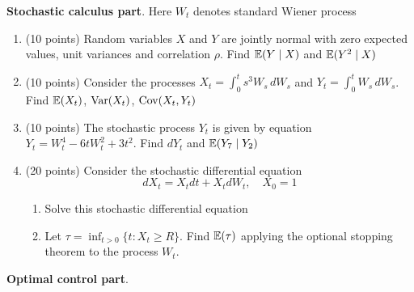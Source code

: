 \documentclass[12pt, a4paper]{article}
\begin{document}
\textbf{Stochastic calculus part}. Here $W_t$ denotes standard Wiener process

\vspace{20pt}

\begin{enumerate}
\item (10 points) Random variables $X$ and $Y$ are jointly normal with zero expected values, unit variances and correlation $\rho$. Find $\operatorname{\mathbb{E}}(Y \mid X)$ and $\operatorname{\mathbb{E}}(Y^2 \mid X)$
\item (10 points) Consider the processes $X_t=\int_0^t s^3 W_s\,dW_s$ and $Y_t=\int_0^t W_s \, dW_s$. Find $\operatorname{\mathbb{E}}(X_t)$, $\operatorname{Var}(X_t)$, $\operatorname{Cov}(X_t,Y_t)$
\item (10 points) The stochastic process $Y_t$ is given by equation $Y_t=W_t^4-6tW_t^2+3t^2$. Find $dY_t$ and $\operatorname{\mathbb{E}}(Y_7 \mid Y_2)$
\item (20 points) Consider the stochastic differential equation
\[
dX_t=X_t dt + X_t dW_t, \quad X_0=1
\]
\begin{enumerate}
\item Solve this stochastic differential equation
\item Let $\tau=\inf_{t>0} \{t:X_t\ge R\}$. Find $\operatorname{\mathbb{E}}(\tau)$ applying the optional stopping theorem to the process $W_t$.
\end{enumerate}

\end{enumerate}

\vspace{20pt}

\textbf{Optimal control part}.

\vspace{20pt}
\end{document}
